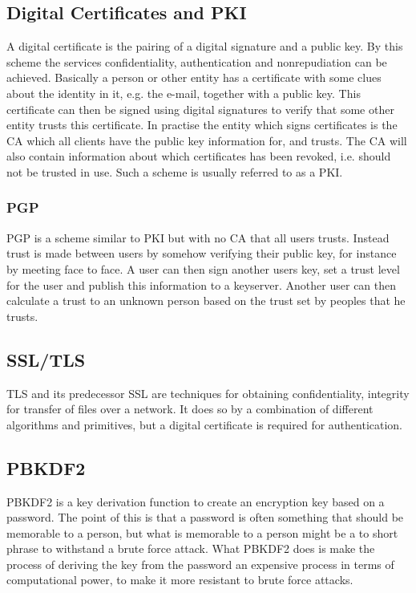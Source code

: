 \documentclass[english,12pt,a4paper]{book}
\begin{document}
\subsection{Digital Certificates and PKI}
A digital certificate is the pairing of a digital signature and a public key.
By this scheme the services confidentiality, authentication and nonrepudiation
can be achieved.  Basically a person or other entity has a certificate with
some clues about the identity in it, e.g. the e-mail, together with a public
key. This certificate can then be signed using digital signatures to verify
that some other entity trusts this certificate. In practise the entity which
signs certificates is the \ac{CA} which all clients have the public key
information for, and trusts. The \ac{CA} will also contain information about
which certificates has been revoked, i.e. should not be trusted in use. Such a
scheme is usually referred
to as a \ac{PKI}.

\subsubsection{PGP}
\ac{PGP} is a scheme similar to \ac{PKI} but with no \ac{CA} that all users
trusts. Instead trust is made between users by somehow verifying their public
key, for instance by meeting face to face. A user can then sign another users
key, set a trust level for the user and publish this information to a
keyserver. Another user can then calculate a trust to an unknown person based
on the trust set by peoples that he trusts. 

\subsection{SSL/TLS}
\ac{TLS} and its predecessor \ac{SSL} are techniques for obtaining
confidentiality, integrity for transfer of files over a
network\cite{stallings}. It does so by a combination of different algorithms
and primitives, but a digital certificate is required for authentication. 

\subsection{PBKDF2}
\ac{PBKDF2} is a key derivation function to create an encryption key based on
a password. The point of this is that a password is often something that should
be memorable to a person, but what is memorable to a person might be a to short
phrase to withstand a brute force attack. What \ac{PBKDF2} does is make the
process of deriving the key from the password an expensive process in terms of
computational power, to make it more resistant to brute force attacks.
\end{document}
